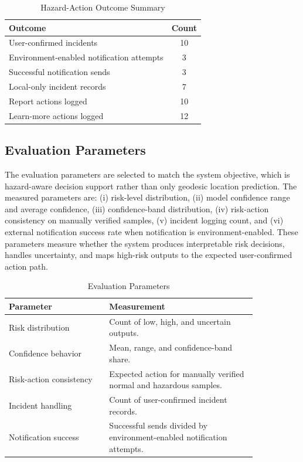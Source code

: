 \documentclass[12pt,a4paper]{article}
\begin{document}
\begin{table}[h]
\caption{Hazard-Action Outcome Summary}
\centering
\begin{tabular}{lc}
\toprule
\textbf{Outcome} & \textbf{Count} \\
\midrule
User-confirmed incidents & 10 \\
Environment-enabled notification attempts & 3 \\
Successful notification sends & 3 \\
Local-only incident records & 7 \\
Report actions logged & 10 \\
Learn-more actions logged & 12 \\
\bottomrule
\end{tabular}
\end{table}

\subsection{Evaluation Parameters}
The evaluation parameters are selected to match the system objective, which is hazard-aware decision support rather than only geodesic location prediction. The measured parameters are: (i) risk-level distribution, (ii) model confidence range and average confidence, (iii) confidence-band distribution, (iv) risk-action consistency on manually verified samples, (v) incident logging count, and (vi) external notification success rate when notification is environment-enabled. These parameters measure whether the system produces interpretable risk decisions, handles uncertainty, and maps high-risk outputs to the expected user-confirmed action path.

\begin{table}[h]
\caption{Evaluation Parameters}
\centering
\begin{tabular}{p{0.34\linewidth}p{0.50\linewidth}}
\toprule
\textbf{Parameter} & \textbf{Measurement} \\
\midrule
Risk distribution & Count of low, high, and uncertain outputs. \\
Confidence behavior & Mean, range, and confidence-band share. \\
Risk-action consistency & Expected action for manually verified normal and hazardous samples. \\
Incident handling & Count of user-confirmed incident records. \\
Notification success & Successful sends divided by environment-enabled notification attempts. \\
\bottomrule
\end{tabular}
\end{table}
\end{document}
